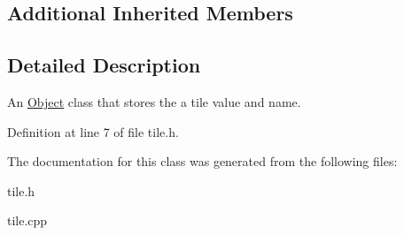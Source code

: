 \subsection*{Additional Inherited Members}


\subsection{Detailed Description}
An \hyperlink{classObject}{Object} class that stores the a tile value and name. 

Definition at line 7 of file tile.\+h.



The documentation for this class was generated from the following files\+:\begin{DoxyCompactItemize}
\item 
tile.\+h\item 
tile.\+cpp\end{DoxyCompactItemize}
